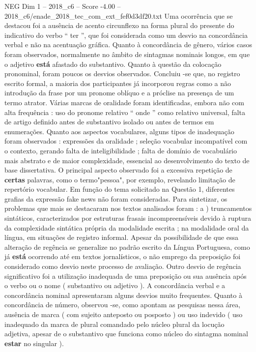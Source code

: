 \begin{textsample}{NEG Dim 1 – 2018\_c6 – Score -4.00 – 2018\_c6/enade\_2018\_tec\_com\_ext\_fef0d3df20.txt}
Uma ocorrência que se destacou foi a ausência de acento circunflexo na forma plural do presente do indicativo do verbo “ ter ”, que foi considerada como um desvio na concordância verbal e não na acentuação gráfica.
Quanto à concordância de gênero, vários casos foram observados, normalmente no âmbito de sintagmas nominais longos, em que o adjetivo \textbf{está} afastado do substantivo.
Quanto à questão da colocação pronominal, foram poucos os desvios observados.
Concluiu -se que, no registro escrito formal, a maioria dos participantes já incorporou regras como a não introdução da frase por um pronome oblíquo e a próclise na presença de um termo atrator.
Várias marcas de oralidade foram identificadas, embora não com alta frequência : uso do pronome relativo “ onde ” como relativo universal, falta de artigo definido antes de substantivo isolado ou antes de termos em enumerações.
Quanto aos aspectos vocabulares, alguns tipos de inadequação foram observados : expressões da oralidade ; seleção vocabular incompatível com o contexto, gerando falta de inteligibilidade ; falta de domínio de vocabulário mais abstrato e de maior complexidade, essencial ao desenvolvimento do texto de base dissertativa.
O principal aspecto observado foi a excessiva repetição de \textbf{certas} palavras, como o termo"pessoa", por exemplo, revelando limitação de repertório vocabular.
Em função do tema solicitado na Questão 1, diferentes grafias da expressão fake news não foram consideradas.
Para sintetizar, os problemas que mais se destacaram nos textos analisados foram : a ) truncamentos sintáticos, caracterizados por estruturas frasais incompreensíveis devido à ruptura da complexidade sintática própria da modalidade escrita ; na modalidade oral da língua, em situações de registro informal.
Apesar da possibilidade de que essa alteração de regência se generalize no padrão escrito da Língua Portuguesa, como já \textbf{está} ocorrendo até em textos jornalísticos, o não emprego da preposição foi considerado como desvio neste processo de avaliação.
Outro desvio de regência significativo foi a utilização inadequada de uma preposição ou sua ausência após o verbo ou o nome ( substantivo ou adjetivo ).
A concordância verbal e a concordância nominal apresentaram alguns desvios muito frequentes.
Quanto à concordância de número, observou -se, como apontam as pesquisas nessa área, ausência de marca ( com sujeito anteposto ou posposto ) ou uso indevido ( uso inadequado da marca de plural comandado pelo núcleo plural da locução adjetiva, apesar de o substantivo que funciona como núcleo do sintagma nominal \textbf{estar} no singular ).

\end{textsample}

